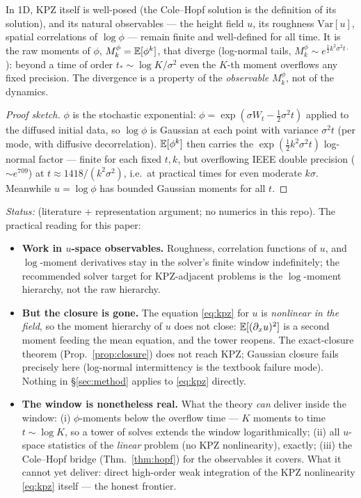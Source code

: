 \begin{proposition}\label{prop:kpz}
In 1D, KPZ itself is well-posed (the Cole--Hopf solution is the definition of
its solution), and its natural observables --- the height field $u$, its
roughness $\mathrm{Var}[u]$, spatial correlations of $\log\phi$ --- remain
finite and well-defined for all time. It is the raw moments of $\phi$,
$M_k^\phi=\mathbb{E}[\phi^k]$, that diverge (log-normal tails, $M_k^\phi \sim
e^{\frac12k^2\sigma^2 t\cdot}$): beyond a time of order
$t_\ast \sim \log K / \sigma^2$ even the $K$-th moment overflows any fixed
precision. The divergence is a property of the \emph{observable} $M_k^\phi$,
not of the dynamics.
\end{proposition}
\begin{proof}[Proof sketch]
$\phi$ is the stochastic exponential: $\phi = \exp(\sigma W_t -
\frac12\sigma^2t)$ applied to the diffused initial data, so
$\log\phi$ is Gaussian at each point with variance $\sigma^2 t$ (per mode, with
diffusive decorrelation). $\mathbb{E}[\phi^k]$ then carries the
$\exp(\frac12 k^2\sigma^2t)$ log-normal factor --- finite for each fixed
$t,k$, but overflowing IEEE double precision ($\sim e^{709}$) at $t \approx
1418/(k^2\sigma^2)$, i.e.\ at practical times for even moderate $k\sigma$.
Meanwhile $u=\log\phi$ has bounded Gaussian moments for all $t$.
\end{proof}
\noindent\emph{Status:} \tagS (literature + representation argument; no
numerics in this repo). The practical reading for this paper:

\begin{itemize}
\item \textbf{Work in $u$-space observables.} Roughness, correlation functions
of $u$, and $\log$-moment derivatives stay in the solver's finite window
indefinitely; the recommended solver target for KPZ-adjacent problems is the
$\log$-moment hierarchy, not the raw hierarchy.
\item \textbf{But the closure is gone.} The equation \eqref{eq:kpz} for $u$ is
\emph{nonlinear in the field}, so the moment hierarchy of $u$ does not close:
$\mathbb{E}[(\partial_xu)^2]$ is a second moment feeding the mean equation, and the
tower reopens. The exact-closure theorem (Prop.~\ref{prop:closure}) does not
reach KPZ; Gaussian closure fails precisely here (log-normal intermittency is
the textbook failure mode). Nothing in \S\ref{sec:method} applies to
\eqref{eq:kpz} directly.
\item \textbf{The window is nonetheless real.} What the theory \emph{can}
deliver inside the window: (i) $\phi$-moments below the overflow time ---
$K$ moments to time $t \sim \log K$, so a tower of solves extends the window
logarithmically; (ii) all $u$-space statistics of the \emph{linear} problem
(no KPZ nonlinearity), exactly; (iii) the Cole--Hopf bridge
(Thm.~\ref{thm:hopf}) for the observables it covers. What it cannot yet
deliver: direct high-order weak integration of the KPZ nonlinearity
\eqref{eq:kpz} itself \tagO --- the honest frontier.
\end{itemize}

